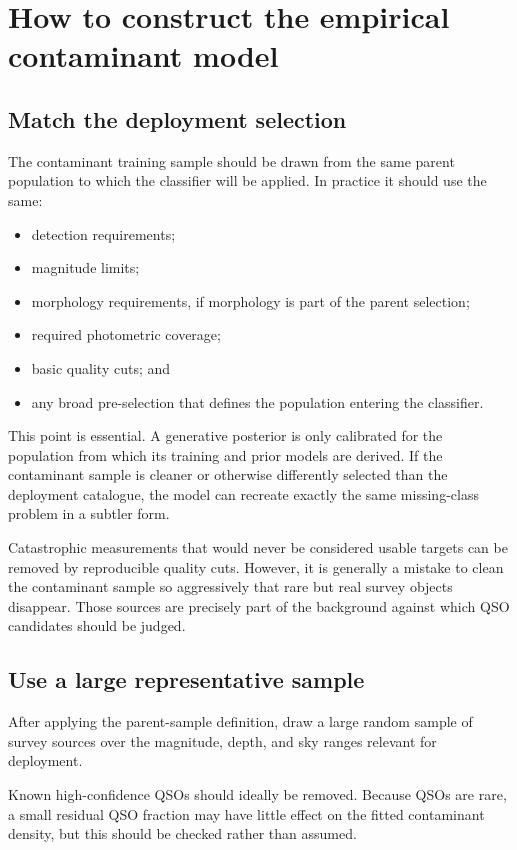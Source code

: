 \documentclass[11pt]{article}
\begin{document}
\section{How to construct the empirical contaminant model}

\subsection{Match the deployment selection}

The contaminant training sample should be drawn from the same parent
population to which the classifier will be applied. In practice it should use
the same:

\begin{itemize}
\item detection requirements;
\item magnitude limits;
\item morphology requirements, if morphology is part of the parent selection;
\item required photometric coverage;
\item basic quality cuts; and
\item any broad pre-selection that defines the population entering the
classifier.
\end{itemize}

This point is essential. A generative posterior is only calibrated for the
population from which its training and prior models are derived. If the
contaminant sample is cleaner or otherwise differently selected than the
deployment catalogue, the model can recreate exactly the same missing-class
problem in a subtler form.

Catastrophic measurements that would never be considered usable targets can
be removed by reproducible quality cuts. However, it is generally a mistake
to clean the contaminant sample so aggressively that rare but real survey
objects disappear. Those sources are precisely part of the background against
which QSO candidates should be judged.

\subsection{Use a large representative sample}

After applying the parent-sample definition, draw a large random sample of
survey sources over the magnitude, depth, and sky ranges relevant for
deployment.

Known high-confidence QSOs should ideally be removed. Because QSOs are rare,
a small residual QSO fraction may have little effect on the fitted contaminant
density, but this should be checked rather than assumed.
\end{document}
